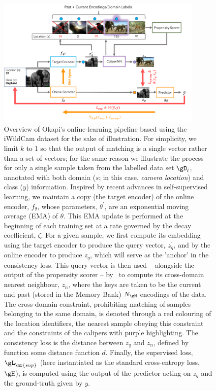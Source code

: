 \begin{figure}[ht]
  \centering
  \includegraphics[width=0.9\textwidth]{figures/ol_pipe_new_new.pdf}
  \caption{
  Overview of Okapi's online-learning pipeline based using the iWildCam dataset for the sake of
  illustration.
  For simplicity, we limit $k$ to 1 so that the output of matching is a single vector rather than a
  set of vectors; for the same reason we illustrate the process for only a single sample 
  taken from the labelled data set $\gD_l$, annotated with both domain ($s$; in this case, \emph{camera
  location}) and class ($y$) information.
  Inspired by recent advances in self-supervised learning, we maintain a copy (the target encoder)
  of the online encoder, $f_\theta$, whose parameters, $\theta^\prime$, are an exponential moving
  average (EMA) of $\theta$. 
  This EMA update is performed at the beginning of each training set at a rate governed by the
  decay coefficient, $\zeta$. 
  For a given sample, we first compute its embedding using the target encoder to
  produce the query vector, $z_q^\prime$, and by the online encoder to produce $z_q$, which will
  serve as the 'anchor' in the consistency loss. 
  This query vector is then used -- alongside the output of the propensity scorer -- by \CNN\ to
  compute its cross-domain nearest neighbour, $z_n$, where the keys are taken to be the current and
  past (stored in the Memory Bank) $N_\gM$ encodings of the data.
  The cross-domain constraint, prohibiting matching of samples belonging to the same domain,
  is denoted through a red colouring of the location identifiers, the nearest sample obeying
  this constraint and the constraints of the calipers with purple highlighting.
  The consistency loss is the distance between $z_q$ and $z_n$, defined by function some distance
  function $d$. 
  Finally, the supervised loss, $\gL_\mr{sup}$ (here instantiated as the standard cross-entropy
  loss, $\gH$), is computed using the output of the predictor
  acting on $z_q$ and the ground-truth given by $y$.
%
  }
  \label{fig:pipeline}
\end{figure}
